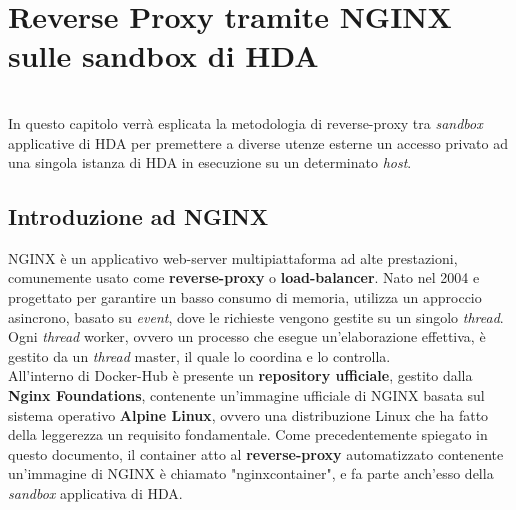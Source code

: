 
\chapter{Reverse Proxy tramite NGINX sulle sandbox di HDA}
\label{cap:nginx-reverse-proxy}
\\
In questo capitolo verrà esplicata la metodologia di reverse-proxy tra \textit{sandbox} applicative di HDA per premettere a diverse utenze esterne un accesso privato ad una singola istanza di HDA in esecuzione su un determinato \textit{host}.

\section{Introduzione ad NGINX}
NGINX è un applicativo web-server multipiattaforma ad alte prestazioni, comunemente usato come \textbf{reverse-proxy} o \textbf{load-balancer}. Nato nel 2004 e progettato per garantire un basso consumo di memoria, utilizza un approccio asincrono, basato su \textit{event}, dove le richieste vengono gestite su un singolo \textit{\gls{thread}}. Ogni \textit{thread} worker, ovvero un processo che esegue un'elaborazione effettiva, è gestito da un \textit{thread} master, il quale lo coordina e lo controlla.\\
All'interno di Docker-Hub è presente un \textbf{repository ufficiale}, gestito dalla \textbf{Nginx Foundations}, contenente un'immagine ufficiale di NGINX basata sul sistema operativo \textbf{Alpine Linux}, ovvero una distribuzione Linux che ha fatto della leggerezza un requisito fondamentale. Come precedentemente spiegato in questo documento, il container atto al \textbf{reverse-proxy} automatizzato contenente un'immagine di NGINX è chiamato "nginxcontainer", e fa parte anch'esso della \textit{sandbox} applicativa di HDA.

